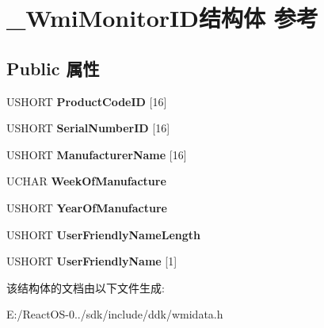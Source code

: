 \hypertarget{struct___wmi_monitor_i_d}{}\section{\+\_\+\+Wmi\+Monitor\+I\+D结构体 参考}
\label{struct___wmi_monitor_i_d}
\subsection*{Public 属性}
\begin{DoxyCompactItemize}
\item 
\mbox{\label{struct___wmi_monitor_i_d_aa15fdca46db0879227e2c31eff77de11}} 
U\+S\+H\+O\+RT {\bfseries Product\+Code\+ID} \mbox{[}16\mbox{]}
\item 
\mbox{\label{struct___wmi_monitor_i_d_af9435bb332082bbef2c1626d1992e83d}} 
U\+S\+H\+O\+RT {\bfseries Serial\+Number\+ID} \mbox{[}16\mbox{]}
\item 
\mbox{\label{struct___wmi_monitor_i_d_a84341ed37f5f9acbf3d4744d79f83cd7}} 
U\+S\+H\+O\+RT {\bfseries Manufacturer\+Name} \mbox{[}16\mbox{]}
\item 
\mbox{\label{struct___wmi_monitor_i_d_a23d98c56549b3770cf07f5d2bedb0f43}} 
U\+C\+H\+AR {\bfseries Week\+Of\+Manufacture}
\item 
\mbox{\label{struct___wmi_monitor_i_d_a5eda20765c28303fac26b003d6f285fb}} 
U\+S\+H\+O\+RT {\bfseries Year\+Of\+Manufacture}
\item 
\mbox{\label{struct___wmi_monitor_i_d_a1b34e40cb84188a3fb36f7fe4ff647c7}} 
U\+S\+H\+O\+RT {\bfseries User\+Friendly\+Name\+Length}
\item 
\mbox{\label{struct___wmi_monitor_i_d_a487e83e54bdf4985c4c5faaa8d923f51}} 
U\+S\+H\+O\+RT {\bfseries User\+Friendly\+Name} \mbox{[}1\mbox{]}
\end{DoxyCompactItemize}


该结构体的文档由以下文件生成\+:\begin{DoxyCompactItemize}
\item 
E\+:/\+React\+O\+S-\/0../sdk/include/ddk/wmidata.\+h\end{DoxyCompactItemize}
